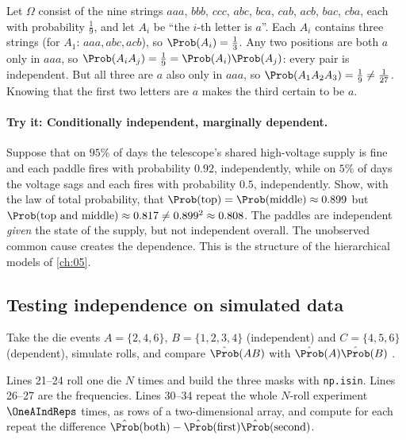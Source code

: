 \label{1a:ex:pairs-no-triple}
Let $\Omega$ consist of the nine strings $aaa$, $bbb$, $ccc$, $abc$, $bca$, $cab$, $acb$, $bac$, $cba$, each
with probability $\tfrac19$, and let $A_i$ be ``the $i$-th letter is $a$''. Each $A_i$
contains three strings (for $A_1$: $aaa,abc,acb$), so $\Prob(A_i)=\tfrac13$. Any two
positions are both $a$ only in $aaa$, so $\Prob(A_iA_j)=\tfrac19=\Prob(A_i)\Prob(A_j)$: every
pair is independent. But all three are $a$ also only in $aaa$, so
$\Prob(A_1A_2A_3)=\tfrac19\neq\tfrac1{27}$. Knowing that the first two letters are $a$
makes the third certain to be $a$.

\paragraph{Try it: Conditionally independent, marginally dependent.}
Suppose that on $95\%$ of days the telescope's shared high-voltage supply is
fine and each paddle fires with probability $0.92$, independently, while on
$5\%$ of days the voltage sags and each fires with probability $0.5$,
independently. Show, with the law of total probability, that
$\Prob(\text{top})=\Prob(\text{middle})\approx0.899$ but
$\Prob(\text{top and middle})\approx0.817\neq0.899^2\approx0.808$. The paddles are
independent \emph{given} the state of the supply, but not independent overall.
The unobserved common cause creates the dependence. This is the structure of
the hierarchical models of \cref{ch:05}.

\subsection{Testing independence on simulated data}

Take the die events $A=\{2,4,6\}$, $B=\{1,2,3,4\}$ (independent) and $C=\{4,5,6\}$
(dependent), simulate rolls, and compare $\hat\Prob(AB)$ with $\hat\Prob(A)\hat\Prob(B)$
.


Lines 21--24 roll one die $N$ times and build the three masks with
\texttt{np.isin}. Lines 26--27 are the frequencies. Lines 30--34 repeat the whole
$N$-roll experiment $\OneAIndReps$ times, as rows of a two-dimensional array, and
compute for each repeat the difference $\hat\Prob(\text{both})-\hat\Prob(\text{first})\hat\Prob(\text{second})$.

